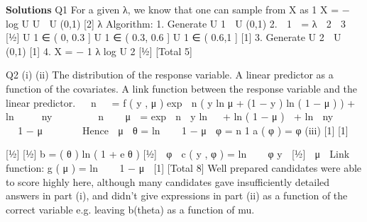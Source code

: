 \documentclass[a4paper,12pt]{article}
\begin{document}
 
\newpage 
\noindent \textbf{Solutions}
Q1
For a given λ, we know that one can sample from X as
1
X = − log U
U  U (0,1)
[2]
λ
Algorithm:
1. Generate U 1  U (0,1)
2.
 1

=
λ  2
 3

[1⁄2]
U 1 ∈ ( 0, 0.3 ]
U 1 ∈ ( 0.3, 0.6 ]
U 1 ∈ ( 0.6,1 ]
[1]
3. Generate U 2  U (0,1)
[1]
4. X = −
1
λ
log U 2
[1⁄2]
[Total 5]

Q2
(i)
(ii)
The distribution of the response variable.
A linear predictor as a function of the covariates.
A link function between the response variable and the linear predictor.

 n  
=
f ( y , μ ) exp  n ( y ln μ + (1 − y ) ln ( 1 − μ ) ) + ln   
 ny  

 

 n  
 μ 
= exp  n  y ln 
 + ln ( 1 − μ )  + ln  ny  
  
 1 − μ 
   

Hence
 μ 
θ = ln 

 1 − μ 
φ = n
1
a ( φ ) =
φ
(iii)
[1]
[1]

[1⁄2]
[1⁄2]
b =
( θ ) ln ( 1 + e θ ) [1⁄2]
 φ 
c ( y , φ ) = ln  
 φ y  [1⁄2]
 μ 
Link function: g ( μ ) = ln 

 1 − μ  [1]
[Total 8]
Well prepared candidates were able to score highly here, although many candidates gave
insufficiently detailed answers in part (i), and didn’t give expressions in part (ii) as a function
of the correct variable e.g. leaving b(theta) as a function of mu.
\end{document}
